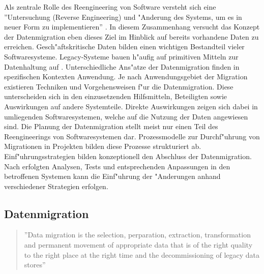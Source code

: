 Als zentrale Rolle des Reengineering von Software versteht sich eine ''Untersuchung (Reverse Engineering) und "Anderung des Systems, um es in neuer Form zu implementieren'' \citep{chikofsky-1990}. In diesem Zusammenhang versucht das Konzept der Datenmigration eben dieses Ziel im Hinblick auf bereits vorhandene Daten zu erreichen. Gesch"aftskritische Daten bilden einen wichtigen Bestandteil vieler Softwaresysteme. Legacy-Systeme bauen h"aufig auf primitiven Mitteln zur Datenhaltung auf \citep{henrard-2002}.
\lb 
Unterschiedliche Ans"atze der Datenmigration finden in spezifischen Kontexten Anwendung. Je nach Anwendungsgebiet der Migration existieren Techniken und Vorgehensweisen f"ur die Datenmigration. Diese unterscheiden sich in den einzusetzenden Hilfsmitteln, Beteiligten sowie Auswirkungen auf andere Systemteile. Direkte Auswirkungen zeigen sich dabei in umliegenden Softwaresystemen, welche auf die Nutzung der Daten angewiesen sind.
\lb
Die Planung der Datenmigration stellt meist nur einen Teil des Reengineerings von Softwaresystemen dar. Prozessmodelle zur Durchf"uhrung von Migrationen in Projekten bilden diese Prozesse strukturiert ab. Einf"uhrungsstrategien bilden konzeptionell den Abschluss der Datenmigration. Nach erfolgten Analysen, Tests und entsprechenden Anpassungen in den betroffenen Systemen kann die Einf"uhrung der "Anderungen anhand verschiedener Strategien erfolgen. 

\subsection{Datenmigration}

\begin{quote}''Data migration is the selection, perparation, extraction, transformation and permanent movement of appropriate data that is of the right quality to the right place at the right time and the decommissioning of legacy data stores'' \flushright\citep[S.~7]{morris-2012}
\end{quote}

